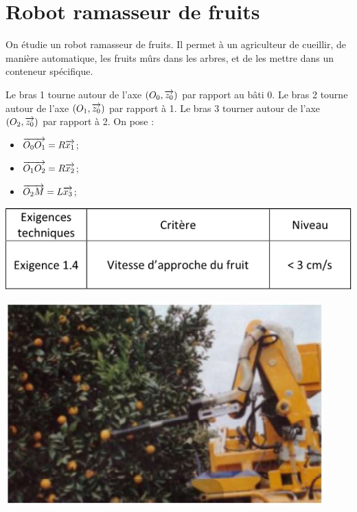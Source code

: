\documentclass[10pt,oneside]{article}
\begin{document}
\section*{Robot ramasseur de fruits} 
On étudie un robot ramasseur de fruits. Il permet à un agriculteur de cueillir, de manière automatique, les fruits mûrs dans les arbres, et de les mettre dans un conteneur spécifique. 

Le bras 1 tourne autour de l'axe $(O_0,\overrightarrow{z_0})$ par rapport au bâti 0. Le bras 2 tourne autour de l'axe $(O_1,\overrightarrow{z_0})$ par rapport à 1. Le bras 3 tourner autour de l'axe $(O_2,\overrightarrow{z_0})$ par rapport à 2. On pose :
\begin{itemize}
\item $\overrightarrow{O_0O_1} = R\overrightarrow{x_1}$;
\item $\overrightarrow{O_1O_2} = R\overrightarrow{x_2}$;
\item $\overrightarrow{O_2M} = L\overrightarrow{x_3}$;
\end{itemize}

\begin{minipage}[c]{.47\linewidth}
\begin{center}
\includegraphics[width=.9\textwidth]{png/fig1}
\end{center}
\end{minipage}\hfill
\begin{minipage}[c]{.47\linewidth}
\begin{center}
\includegraphics[width=.9\textwidth]{png/fig2}
\end{center}
\end{minipage}
\end{document}
